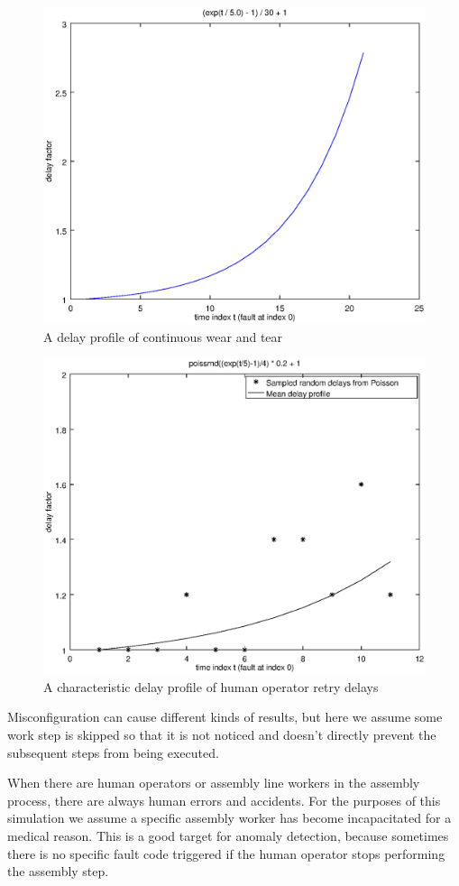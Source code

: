 \documentclass[journal]{IEEEtran}
\begin{document}
\begin{figure}[tb]
 \centering
 \includegraphics[width=8 cm,keepaspectratio=true]{./failure_profile.eps}
 \caption{A delay profile of continuous wear and tear}
 \label{figure:continuouswearandtear}
\end{figure}

\begin{figure}[tb]
 \centering
 \includegraphics[width=8 cm,keepaspectratio=true]{./retry_profile.eps}
 \caption{A characteristic delay profile of human operator retry delays}
 \label{figure:retrydelays}
\end{figure}

Misconfiguration can cause different kinds of results, but here we assume some work step is skipped
so that it is not noticed and doesn't directly prevent the subsequent steps from being executed. 

When there are human operators or assembly line workers in the assembly process, there are always human errors and accidents. For the purposes of this simulation we
assume a specific assembly worker has become incapacitated for a medical reason. This is a good target for anomaly detection, because sometimes there is no specific fault code
triggered if the human operator stops performing the assembly step.
\end{document}

